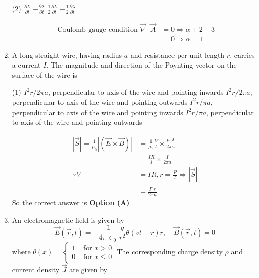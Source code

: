 \begin{enumerate}
\begin{minipage}{\textwidth}
	\end{minipage}
	\begin{tasks}(2)
		\task[\textbf{A.}] $\frac{\partial \lambda}{\partial t}$
		\task[\textbf{B.}]$-\frac{\partial \lambda}{\partial t}$
		\task[\textbf{C.}]$\frac{1}{2} \frac{\partial \lambda}{\partial t}$
		\task[\textbf{D.}]$-\frac{1}{2} \frac{\partial \lambda}{\partial t}$
	\end{tasks}
\begin{answer}
	\begin{align*}
	\text{	Coulomb gauge condition }\vec{\nabla} \cdot \vec{A}&=0 \Rightarrow \alpha+2-3\\&=0 \Rightarrow \alpha=1
	\end{align*}
\end{answer}
	\item A long straight wire, having radius $a$ and resistance per unit length $r$, carries a current $I$. The magnitude and direction of the Poynting vector on the surface of the wire is
	{}
	\begin{tasks}(1)
		\task[\textbf{A.}] $I^{2} r / 2 \pi a$, perpendicular to axis of the wire and pointing inwards
		\task[\textbf{B.}]$I^{2} r / 2 \pi a$, perpendicular to axis of the wire and pointing outwards
		\task[\textbf{C.}]$I^{2} r / \pi a$, perpendicular to axis of the wire and pointing inwards
		\task[\textbf{D.}]$I^{2} r / \pi a$, perpendicular to axis of the wire and pointing outwards
	\end{tasks}
\begin{answer}
	\begin{align*}
	|\vec{S}|=\frac{1}{\mu_{0}}|(\vec{E} \times \vec{B})|&=\frac{1}{\mu_{0}} \frac{V}{l} \times \frac{\mu_{0} I}{2 \pi a}\\&=\frac{I R}{l} \times \frac{I}{2 \pi a}\\
	\because V&=I R, r=\frac{R}{l} \Rightarrow|\vec{S}|\\&=\frac{I^{2} r}{2 \pi a}
	\end{align*}
	So the correct answer is \textbf{Option (A)}
\end{answer}
	\item  An electromagnetic field is given by
	$$
	\vec{E}(\vec{r}, t)=-\frac{1}{4 \pi \in_{0}} \frac{q}{r^{2}} \theta(v t-r) \dot{r}, \quad \vec{B}(\vec{r}, t)=0
	$$
	where $\theta(x)= \begin{cases}1 & \text { for } x>0 \\ 0 & \text { for } x \leq 0\end{cases}$
	The corresponding charge density $\rho$ and current density $\vec{J}$ are given by

\end{enumerate}
